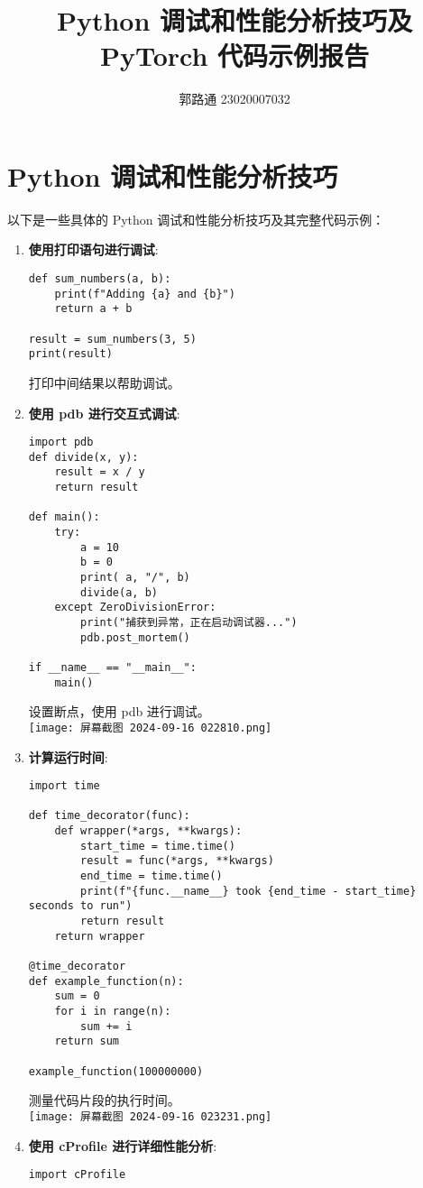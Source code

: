 \documentclass{ctexart}
\begin{document}
\title{Python 调试和性能分析技巧及 PyTorch 代码示例报告}
\author{郭路通  23020007032}
\date{}
\maketitle

\section{Python 调试和性能分析技巧}

以下是一些具体的 Python 调试和性能分析技巧及其完整代码示例：

\begin{enumerate}[label=\arabic*.]
\item \textbf{使用打印语句进行调试}:
\begin{lstlisting}
def sum_numbers(a, b):
    print(f"Adding {a} and {b}")
    return a + b

result = sum_numbers(3, 5)
print(result)
\end{lstlisting}
打印中间结果以帮助调试。

\item \textbf{使用 pdb 进行交互式调试}:
\begin{lstlisting}
import pdb
def divide(x, y):
    result = x / y
    return result

def main():
    try:
        a = 10
        b = 0
        print( a, "/", b)
        divide(a, b)
    except ZeroDivisionError:
        print("捕获到异常，正在启动调试器...")
        pdb.post_mortem()

if __name__ == "__main__":
    main()
\end{lstlisting}
设置断点，使用 pdb 进行调试。\\
\texttt{[image: 屏幕截图 2024-09-16 022810.png]}
\item \textbf{计算运行时间}:
\begin{lstlisting}
import time

def time_decorator(func):
    def wrapper(*args, **kwargs):
        start_time = time.time()
        result = func(*args, **kwargs)
        end_time = time.time()
        print(f"{func.__name__} took {end_time - start_time} seconds to run")
        return result
    return wrapper

@time_decorator
def example_function(n):
    sum = 0
    for i in range(n):
        sum += i
    return sum

example_function(100000000)
\end{lstlisting}
测量代码片段的执行时间。\\
\texttt{[image: 屏幕截图 2024-09-16 023231.png]}
\item \textbf{使用 cProfile 进行详细性能分析}:
\begin{lstlisting}
import cProfile


\end{lstlisting}
\end{enumerate}
\end{document}
